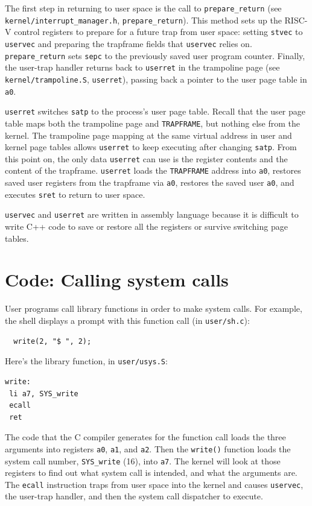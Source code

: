 The first step in returning to user space is the call to {\tt prepare\_return}
(see \texttt{kernel/interrupt\_manager.h}, \texttt{prepare\_return}).
This method sets up the RISC-V control registers to prepare for a
future trap from user space: setting {\tt stvec}
to {\tt uservec} and preparing the trapframe fields that
{\tt uservec} relies on.
{\tt prepare\_return} sets {\tt sepc} to the previously
saved user program counter.
Finally, the user-trap handler
returns back to {\tt userret} in the trampoline page
(see \texttt{kernel/trampoline.S}, \texttt{userret}),
passing back a pointer to the user page table in {\tt a0}.

{\tt userret} switches {\tt satp} to the process's user page table.
Recall that the user page table maps both the trampoline page
and {\tt TRAPFRAME}, but nothing else from the kernel.
The trampoline page mapping at the same
virtual address in user and kernel page tables allows
{\tt userret} to keep executing after changing {\tt satp}.
From this point on, the only data {\tt userret} can use is
the register contents and the content of the trapframe.
{\tt userret} loads the {\tt TRAPFRAME} address into {\tt a0},
restores saved user registers from the trapframe via {\tt a0},
restores the saved user {\tt a0},
and executes {\tt sret} to return to user space.

{\tt uservec} and {\tt userret} are written in assembly
language because it is difficult to write C++ code to
save or restore all the registers or survive switching
page tables.

\section{Code: Calling system calls}

User programs call library functions in order to make system calls.
For example, the shell displays a prompt with this function call
(in {\tt user/sh.c}):

\begin{verbatim}
  write(2, "$ ", 2);
\end{verbatim}

Here's the library function, in {\tt user/usys.S}:

\begin{verbatim}
write:
 li a7, SYS_write
 ecall
 ret
\end{verbatim}

The code that the C compiler generates for the function call
loads the three arguments into registers {\tt a0},
{\tt a1}, and {\tt a2}. Then the {\tt write()} function
loads the system call number, {\tt SYS\_write} (16), into {\tt a7}.
The kernel will look at those registers to find out what
system call is intended, and what the arguments are.
The \lstinline{ecall} instruction traps from user space
into the kernel and causes
{\tt uservec},
the user-trap handler, and then the system call dispatcher to execute.

